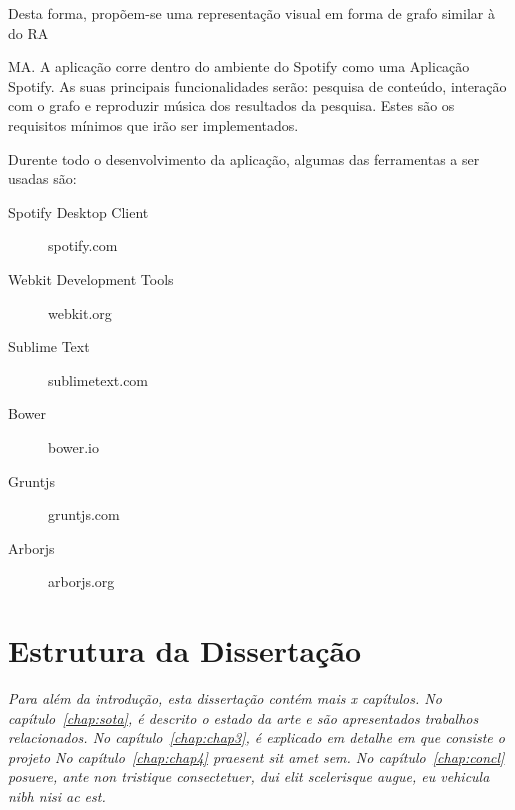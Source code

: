 Desta forma, propõem-se uma representação visual em forma de grafo similar à do RA
  \item [Gruntjs]MA.
A aplicação corre dentro do ambiente do Spotify como uma Aplicação Spotify.
As suas principais funcionalidades serão: pesquisa de conteúdo, interação com o grafo e reproduzir música dos resultados da pesquisa.
Estes são os requisitos mínimos que irão ser implementados.

Durente todo o desenvolvimento da aplicação, algumas das ferramentas a ser usadas são:

\begin{description}
  \item[Spotify Desktop Client] spotify.com
  \item[Webkit Development Tools] webkit.org
  \item[Sublime Text] sublimetext.com
  \item[Bower] bower.io
  \item[Gruntjs] gruntjs.com
  \item[Arborjs] arborjs.org
\end{description}



\section{Estrutura da Dissertação} \label{sec:struct}

\emph{Para além da introdução, esta dissertação contém mais x capítulos.
No capítulo~\ref{chap:sota}, é descrito o estado da arte e são
apresentados trabalhos relacionados.
No capítulo~\ref{chap:chap3}, é explicado em detalhe em que consiste o projeto
No capítulo~\ref{chap:chap4} praesent sit amet sem. 
No capítulo~\ref{chap:concl}  posuere, ante non tristique
consectetuer, dui elit scelerisque augue, eu vehicula nibh nisi ac
est. 
}